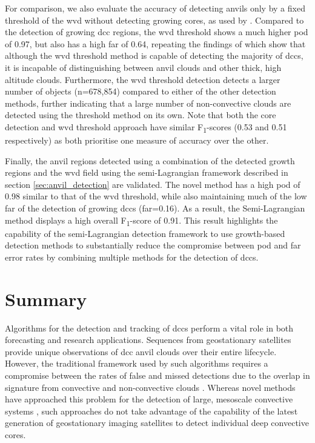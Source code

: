 For comparison, we also evaluate the accuracy of detecting anvils only by a fixed threshold of the \acrshort{wvd} without detecting growing cores, as used by \citet{muller_role_2018}.
Compared to the detection of growing \acrshort{dcc} regions, the \acrshort{wvd} threshold shows a much higher \acrshort{pod} of 0.97, but also has a high \acrshort{far} of 0.64, repeating the findings of \citet{muller_novel_2019} which show that although the \acrshort{wvd} threshold method is capable of detecting the majority of \acrshort{dcc}s, it is incapable of distinguishing between anvil clouds and other thick, high altitude clouds.
Furthermore, the \acrshort{wvd} threshold detection detects a larger number of objects (n=678,854) compared to either of the other detection methods, further indicating that a large number of non-convective clouds are detected using the threshold method on its own.
Note that both the core detection and \acrshort{wvd} threshold approach have similar F\textsubscript{1}-scores (0.53 and 0.51 respectively) as both prioritise one measure of accuracy over the other.

Finally, the anvil regions detected using a combination of the detected growth regions and the \acrshort{wvd} field using the semi-Lagrangian framework described in section \ref{sec:anvil_detection} are validated.
The novel method has a high \acrshort{pod} of 0.98 similar to that of the \acrshort{wvd} threshold, while also maintaining much of the low \acrshort{far} of the detection of growing \acrshort{dcc}s (\acrshort{far}=0.16).
As a result, the Semi-Lagrangian method displays a high overall F\textsubscript{1}-score of 0.91.
This result highlights the capability of the semi-Lagrangian detection framework to use growth-based detection methods to substantially reduce the compromise between \acrshort{pod} and \acrshort{far} error rates by combining multiple methods for the detection of \acrshort{dcc}s.


\section{Summary}  %

Algorithms for the detection and tracking of \acrshort{dcc}s perform a vital role in both forecasting and research applications.
Sequences from geostationary satellites provide unique observations of \acrshort{dcc} anvil clouds over their entire lifecycle.
However, the traditional framework used by such algorithms requires a compromise between the rates of false and missed detections due to the overlap in signature from convective and non-convective clouds \citep{konduru_new_2013}.
Whereas novel methods have approached this problem for the detection of large, mesoscale convective systems \citep{fiolleau_algorithm_2013}, such approaches do not take advantage of the capability of the latest generation of geostationary imaging satellites to detect individual deep convective cores.

